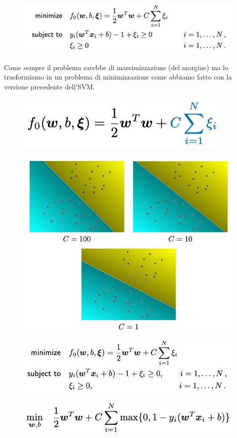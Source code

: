 \documentclass[14pt]{extreport}
\begin{document}
 
\begin{figure}[H]
\centering
\includegraphics[width=0.7\linewidth]{324.jpeg}
\end{figure}

Come sempre il problema sarebbe di massimizzazione (del margine) ma lo trasformiamo in un problema di minimizzazione come abbiamo fatto con la
versione precedente dell'SVM.


\begin{figure}[H]
\centering
  \includegraphics[width=0.7\linewidth]{325.jpeg}
\end{figure}
\begin{figure}[H]
\centering
  \includegraphics[width=0.7\linewidth]{326.jpeg}
\end{figure}
\begin{figure}[H]
\centering
  \includegraphics[width=0.7\linewidth]{327.jpeg}
\end{figure}
\begin{figure}[H]
\centering
  \includegraphics[width=0.7\linewidth]{328.jpeg}
\end{figure}
\end{document}

